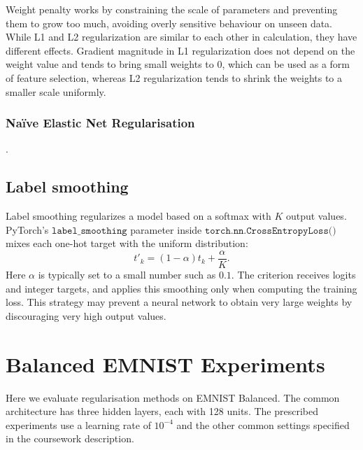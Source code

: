 \documentclass{article}
\begin{document}
Weight penalty works by constraining the scale of parameters and preventing them to grow too much, avoiding overly sensitive behaviour on unseen data.
While L1 and L2 regularization are similar to each other in calculation, they have different effects.
Gradient magnitude in L1 regularization does not depend on the weight value and tends to bring small weights to 0, which can be used as a form of feature selection, whereas L2 regularization tends to shrink the weights to a smaller scale uniformly. 

\subsubsection{Na\"ive Elastic Net Regularisation}

\questionOne.

\subsection{Label smoothing}
Label smoothing regularizes a model based on a softmax with $K$ output values. PyTorch's $\texttt{label\_smoothing}$ parameter inside $\texttt{torch.nn.CrossEntropyLoss()}$  mixes each one-hot target with the uniform distribution:
\begin{equation}
    t'_k=(1-\alpha)t_k+\frac{\alpha}{K}.
\end{equation}
Here $\alpha$ is typically set to a small number such as $0.1$. The criterion receives logits and integer targets, and applies this smoothing only when computing the training loss.
This strategy may prevent a neural network to obtain very large weights by discouraging very high output values.

\section{Balanced EMNIST Experiments}

\questionTableThree

\questionFigureFour

\questionTableFour

\questionFigureFive


\label{sec:task2.2}

Here we evaluate regularisation methods on EMNIST Balanced.
The common architecture has three hidden layers, each with
128 units. The prescribed experiments use a learning rate
of $10^{-4}$ and the other common settings specified in
the coursework description.
\end{document}
